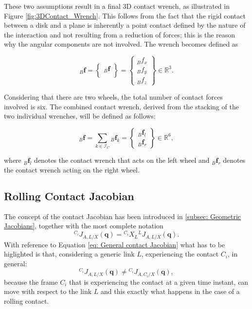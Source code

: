 These two assumptions result in a final 3D contact wrench, as illustrated in Figure \ref{fig:3DContact_Wrench}. This follows from the fact that the rigid contact between a disk and a plane is inherently a point contact defined by the nature of the interaction and not resulting from a reduction of forces; this is the reason why the angular components are not involved.
The wrench becomes defined as

\begin{equation}
    {}_{B}\mathbf{f} = 
    \begin{Bmatrix}
    {}_{B}\bm{f} \\
    \end{Bmatrix} = 
    \begin{Bmatrix}
    {}_{B}{f}_{x} \\
    {}_{B}{f}_{y} \\
    {}_{B}{f}_{z} 
    \end{Bmatrix} \in \mathbb{R}^{3}.
    \label{eq:3DContact_Wrench}
\end{equation}

Considering that there are two wheels, the total number of contact forces involved is six. The combined contact wrench, derived from the stacking of the two individual wrenches, will be defined as follows:

\begin{equation}
    {}_{B}\mathbf{f}= \sum_{k \in \mathcal{I}_C} {}_{B}\mathbf{f}_{k} = \begin{Bmatrix}
    {}_{B}\bm{f}_l \\
    {}_{B}\bm{f}_r
    \end{Bmatrix} \in \mathbb{R}^{6},
    \label{eq:Total Contact Wrench}
\end{equation}

where ${}_{B}\bm{f}_l$ denotes the contact wrench that acts on the left wheel and ${}_{B}\bm{f}_r$ denotes the contact wrench acting on the right wheel.

\subsection{Rolling Contact Jacobian}
\label{subsec:Rolling Contact Jacobian}

The concept of the contact Jacobian has been introduced in \cref{subsec: Geometric Jacobians}, together with the most complete notation
    \begin{equation*}
        {}^{C_i} J_{A,L/X}(\mathbf{q}) = {}^{C_i}X_{L} {}^{L}J_{A,L/X}(\mathbf{q}).
    \end{equation*}
With reference to Equation \eqref{eq: General contact Jacobian} what has to be higlighted is that, considering a generic link $L$, experiencing the contact $C_i$, in general:
$${}^{C_i} J_{A,L/X}(\mathbf{q}) \neq {}^{C_i}J_{A,C_i/X}(\mathbf{q}),$$
because the frame $C_i$ that is experiencing the contact at a given time instant, can move with respect to the link $L$ and this exactly what happens in the case of a rolling contact.

